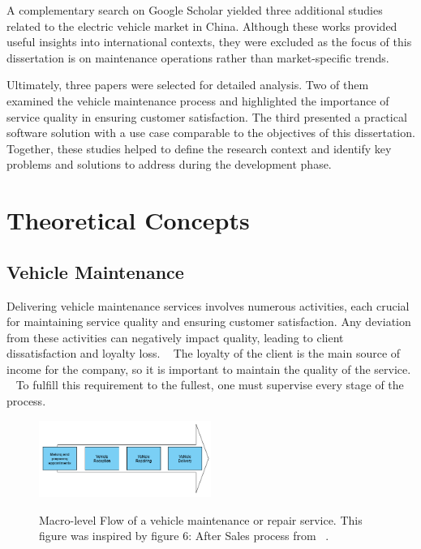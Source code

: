 A complementary search on Google Scholar yielded three additional studies related to the electric vehicle market in China. Although these works provided useful insights into international contexts, they were excluded as the focus of this dissertation is on maintenance operations rather than market-specific trends.

Ultimately, three papers were selected for detailed analysis. Two of them examined the vehicle maintenance process and highlighted the importance of service quality in ensuring customer satisfaction. The third presented a practical software solution with a use case comparable to the objectives of this dissertation. Together, these studies helped to define the research context and identify key problems and solutions to address during the development phase.

\section{Theoretical Concepts}

\subsection{Vehicle Maintenance}

Delivering vehicle maintenance services involves numerous activities, each crucial for maintaining service quality and ensuring customer satisfaction. 
Any deviation from these activities can negatively impact quality, leading to client dissatisfaction and loyalty loss. ~\cite{Setting_the_after_sale_process}
The loyalty of the client is the main source of income for the company, so it is important to maintain the quality of the service. ~\cite{Setting_the_after_sale_process}
To fulfill this requirement to the fullest, one must supervise every stage of the process. ~\cite{Setting_the_after_sale_process}


\begin{figure}[h]
  \caption{Macro-level Flow of a vehicle maintenance or repair service. This figure was inspired by figure 6: After Sales process from ~\citet{Setting_the_after_sale_process}.}
  \centering
  \includegraphics[width=0.50\textwidth]{figs/Vehicle_maintenace_macro}
  \label{fig:Vehicle_maintenace_macro}
\end{figure}

